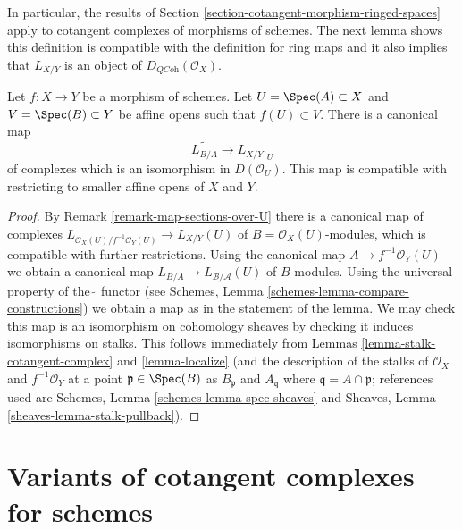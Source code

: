 \noindent
In particular, the results of
Section \ref{section-cotangent-morphism-ringed-spaces} apply
to cotangent complexes of morphisms of schemes.
The next lemma shows this definition is compatible with the definition
for ring maps and it also implies that $L_{X/Y}$ is an
object of $D_{\textit{QCoh}}(\mathcal{O}_X)$.

\begin{lemma}
\label{lemma-morphism-affine-schemes}
Let $f : X \to Y$ be a morphism of schemes. Let $U = \Spec(A) \subset X$
and $V = \Spec(B) \subset Y$ be affine opens such that $f(U) \subset V$.
There is a canonical map
$$
\widetilde{L_{B/A}} \longrightarrow L_{X/Y}|_U
$$
of complexes which is an isomorphism in $D(\mathcal{O}_U)$.
This map is compatible with restricting to smaller affine opens
of $X$ and $Y$.
\end{lemma}

\begin{proof}
By Remark \ref{remark-map-sections-over-U}
there is a canonical map of complexes
$L_{\mathcal{O}_X(U)/f^{-1}\mathcal{O}_Y(U)} \to L_{X/Y}(U)$
of $B = \mathcal{O}_X(U)$-modules, which is compatible
with further restrictions. Using the canonical map
$A \to f^{-1}\mathcal{O}_Y(U)$ we obtain a canonical map
$L_{B/A} \to L_{\mathcal{B}/\mathcal{A}}(U)$
of $B$-modules. Using the universal property of the $\widetilde{\ }$
functor (see Schemes, Lemma \ref{schemes-lemma-compare-constructions})
we obtain a map as in the statement of the lemma.
We may check this map is an isomorphism on cohomology sheaves
by checking it induces isomorphisms on stalks.
This follows immediately from
Lemmas \ref{lemma-stalk-cotangent-complex} and \ref{lemma-localize}
(and the description of the stalks of
$\mathcal{O}_X$ and $f^{-1}\mathcal{O}_Y$
at a point $\mathfrak p \in \Spec(B)$ as $B_\mathfrak p$ and
$A_\mathfrak q$ where $\mathfrak q = A \cap \mathfrak p$; references
used are Schemes, Lemma \ref{schemes-lemma-spec-sheaves}
and
Sheaves, Lemma \ref{sheaves-lemma-stalk-pullback}).
\end{proof}








\section{Variants of cotangent complexes for schemes}
\label{section-cotangent-schemes-variant}

